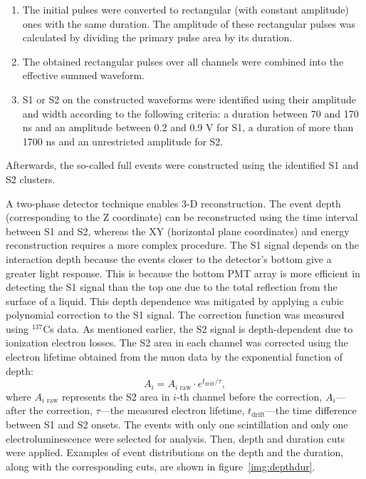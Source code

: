 \documentclass[a4paper,11pt]{article}
\begin{document}
\begin{enumerate}
    \item
    The initial pulses were converted to rectangular (with constant amplitude) ones with the same duration.
    The amplitude of these rectangular pulses was calculated by dividing the primary pulse area by its duration. 
    \item The obtained rectangular pulses over all channels were combined into the effective summed waveform.
    \item 
    S1 or S2 on the constructed waveforms were identified using their amplitude and width according to the following criteria: a duration between 70 and 170 ns and an amplitude between 0.2 and 0.9 V for S1,
    a duration of more than 1700 ns and an unrestricted amplitude for S2. 
\end{enumerate}

Afterwards, the so-called full events were constructed using the identified S1 and S2 clusters. 

A two-phase detector technique enables 3-D reconstruction.
The event depth (corresponding to the Z coordinate) can be reconstructed using the time interval between S1 and S2, whereas the XY (horizontal plane coordinates) and energy reconstruction requires a more complex procedure.
The S1 signal depends on the interaction depth because the events closer to the detector's bottom give a greater light response.
This is because the bottom PMT array is more efficient in detecting the S1 signal than the top one due to the total reflection from the surface of a liquid. This depth dependence was mitigated by applying a cubic polynomial correction to the S1 signal. The correction function was measured using $^{137}$Cs data. As mentioned earlier, the S2 signal is depth-dependent due to ionization electron losses. 
The S2 area in each channel was corrected using the electron lifetime obtained from the muon data by the exponential function of depth:
\begin{equation}
A_{{i }}=A_{i \text{ raw}} \cdot e^{{t_{\text {drift}}}/{\tau}},
\end{equation}
where $A_{i \text{ raw}} $ represents the S2 area in $i$-th channel before the correction, $A_{{i }}$---after the correction, $\tau$---the measured electron lifetime, $t_{\text {drift}}$---the time difference between S1 and S2 onsets. 
The events with only one scintillation and only one electroluminescence were selected for analysis. Then, depth and duration cuts were applied. Examples of event distributions on the depth and the duration, along with the corresponding cuts, are shown in figure~\ref{img:depthdur}.
\end{document}
